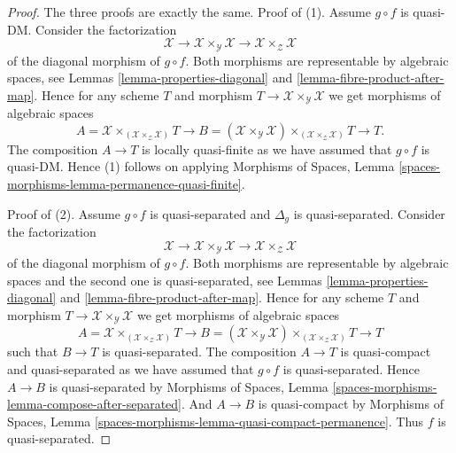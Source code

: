 \begin{proof}
The three proofs are exactly the same.
Proof of (1). Assume $g \circ f$ is quasi-DM. Consider the factorization
$$
\mathcal{X} \to
\mathcal{X} \times_\mathcal{Y} \mathcal{X} \to
\mathcal{X} \times_\mathcal{Z} \mathcal{X}
$$
of the diagonal morphism of $g \circ f$. Both morphisms are
representable by algebraic spaces, see
Lemmas \ref{lemma-properties-diagonal} and
\ref{lemma-fibre-product-after-map}.
Hence for any scheme $T$ and morphism
$T \to \mathcal{X} \times_\mathcal{Y} \mathcal{X}$
we get morphisms of algebraic spaces
$$
A = \mathcal{X} \times_{(\mathcal{X} \times_{\mathcal{Z}} \mathcal{X})} T
\longrightarrow
B = (\mathcal{X} \times_\mathcal{Y} \mathcal{X})
\times_{(\mathcal{X} \times_{\mathcal{Z}} \mathcal{X})} T
\longrightarrow
T.
$$
The composition $A \to T$ is locally quasi-finite as we have assumed
that $g \circ f$ is quasi-DM. Hence (1) follows on applying
Morphisms of Spaces,
Lemma \ref{spaces-morphisms-lemma-permanence-quasi-finite}.

\medskip\noindent
Proof of (2). Assume $g \circ f$ is quasi-separated and $\Delta_g$ is
quasi-separated. Consider the factorization
$$
\mathcal{X} \to
\mathcal{X} \times_\mathcal{Y} \mathcal{X} \to
\mathcal{X} \times_\mathcal{Z} \mathcal{X}
$$
of the diagonal morphism of $g \circ f$. Both morphisms are
representable by algebraic spaces and the second one is quasi-separated, see
Lemmas \ref{lemma-properties-diagonal} and
\ref{lemma-fibre-product-after-map}.
Hence for any scheme $T$ and morphism
$T \to \mathcal{X} \times_\mathcal{Y} \mathcal{X}$
we get morphisms of algebraic spaces
$$
A = \mathcal{X} \times_{(\mathcal{X} \times_{\mathcal{Z}} \mathcal{X})} T
\longrightarrow
B = (\mathcal{X} \times_\mathcal{Y} \mathcal{X})
\times_{(\mathcal{X} \times_{\mathcal{Z}} \mathcal{X})} T
\longrightarrow
T
$$
such that $B \to T$ is quasi-separated.
The composition $A \to T$ is quasi-compact and quasi-separated
as we have assumed that $g \circ f$ is quasi-separated.
Hence $A \to B$ is quasi-separated by
Morphisms of Spaces,
Lemma \ref{spaces-morphisms-lemma-compose-after-separated}.
And $A \to B$ is quasi-compact by
Morphisms of Spaces,
Lemma \ref{spaces-morphisms-lemma-quasi-compact-permanence}.
Thus $f$ is quasi-separated.


\end{proof}
